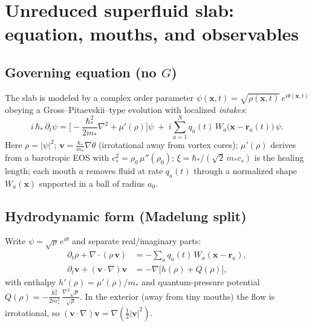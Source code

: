 \documentclass[11pt]{article}
\numberwithin{equation}{section}
\theoremstyle{plain}
\theoremstyle{remark}
\theoremstyle{definition}
\begin{document}
\section{Unreduced superfluid slab: equation, mouths, and observables}
\label{sec:model}

\subsection{Governing equation (no $G$)}
The slab is modeled by a complex order parameter $\psi(\mathbf x,t)=\sqrt{\rho(\mathbf x,t)}\,e^{i\theta(\mathbf x,t)}$ obeying a Gross--Pitaevskii--type evolution with localized \emph{intakes}:
\begin{equation}
i\,\hbar_*\,\partial_t\psi
=\Big[-\frac{\hbar_*^2}{2m_*}\nabla^2+\mu'(\rho)\Big]\psi
\;+\; i\sum_{a=1}^N q_a(t)\,W_a\!\big(\mathbf x-\mathbf r_a(t)\big)\,\psi .
\label{eq:GP}
\end{equation}
Here $\rho=|\psi|^2$; $\mathbf v=\frac{\hbar_*}{m_*}\nabla\theta$ (irrotational away from vortex cores); $\mu'(\rho)$ derives from a barotropic EOS with $c_s^2=\rho_0\,\mu''(\rho_0)$;  $\xi=\hbar_*/(\sqrt2\,m_*c_s)$ is the healing length; each mouth $a$ removes fluid at rate $q_a(t)$ through a normalized shape $W_a(\mathbf x)$ supported in a ball of radius $a_0$.

\subsection{Hydrodynamic form (Madelung split)}
Write $\psi=\sqrt\rho\,e^{i\theta}$ and separate real/imaginary parts:
\begin{align}
\partial_t\rho+\nabla\!\cdot(\rho\,\mathbf v)&= -\sum_a q_a(t)\,W_a(\mathbf x-\mathbf r_a),
\label{eq:cont}\\
\partial_t\mathbf v+(\mathbf v\!\cdot\!\nabla)\mathbf v&= -\nabla\!\Big[h(\rho)+Q(\rho)\Big],
\label{eq:euler}
\end{align}
with enthalpy $h'(\rho)=\mu'(\rho)/m_*$ and quantum-pressure potential
$Q(\rho) = -\frac{\hbar_*^2}{2m_*^2}\,\frac{\nabla^2\sqrt{\rho}}{\sqrt{\rho}}$.
In the exterior (away from tiny mouths) the flow is irrotational, so $(\mathbf v\!\cdot\!\nabla)\mathbf v=\nabla(\tfrac12|\mathbf v|^2)$.
\end{document}
